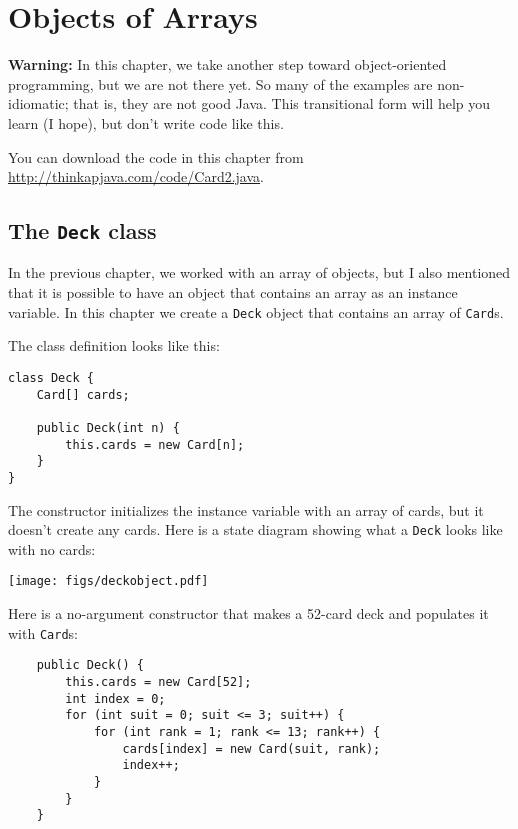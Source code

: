 \documentclass[12pt]{book}
\def\WARNING{\textbf{Warning:}}
\theoremstyle{definition}
\begin{document}
\chapter{Objects of Arrays}
\label{chap12}

\WARNING{} In this chapter, we take another step toward object-oriented
programming, but we are not there yet.  So many of the examples are
non-idiomatic; that is, they are not good Java.  This transitional
form will help you learn (I hope), but don't write code like this.

You can download the code in this chapter from
\url{http://thinkapjava.com/code/Card2.java}.


\section{The {\tt Deck} class}
\label{deck}

In the previous chapter, we worked with an array of objects,
but I also mentioned that it is possible to have an object
that contains an array as an instance variable.  In this
chapter we create a {\tt Deck} object
that contains an array of {\tt Card}s.


The class definition looks like this:

\begin{lstlisting}
class Deck {
    Card[] cards;

    public Deck(int n) {
        this.cards = new Card[n];
    }
}
\end{lstlisting}
%
The constructor initializes the instance variable with
an array of cards, but it doesn't create any cards.
Here is a state diagram showing what a
{\tt Deck} looks like with no cards:


\texttt{[image: figs/deckobject.pdf]}

Here is a no-argument constructor that makes a
52-card deck and populates it with {\tt Card}s:

\begin{lstlisting}
    public Deck() {
        this.cards = new Card[52];
        int index = 0;
        for (int suit = 0; suit <= 3; suit++) {
            for (int rank = 1; rank <= 13; rank++) {
                cards[index] = new Card(suit, rank);
                index++;
            }
        }
    }
\end{lstlisting}
\end{document}
